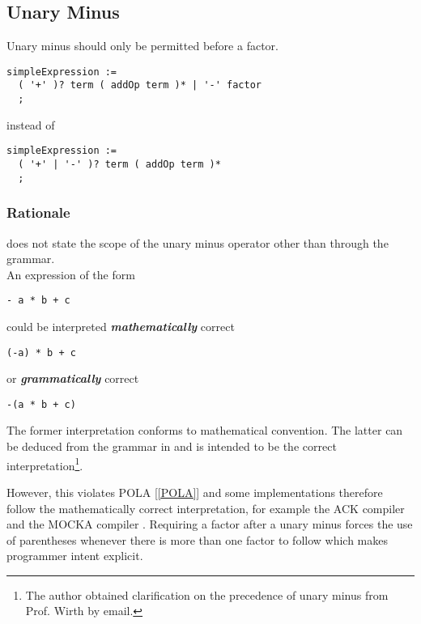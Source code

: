 \documentclass[10pt,a4paper]{article}
\renewcommand{\emph}[1]{\textbf{\textit{#1}}}
\begin{document}
\subsection{Unary Minus}

Unary minus should only be permitted before a factor.

\begin{verbatim}
simpleExpression :=
  ( '+' )? term ( addOp term )* | '-' factor
  ;
\end{verbatim}

\noindent instead of

\begin{verbatim}
simpleExpression :=
  ( '+' | '-' )? term ( addOp term )*
  ;
\end{verbatim}

\subsubsection{Rationale}

\cite{Wirth88} does not state the scope of the unary minus operator other than
through the grammar.\\

\noindent An expression of the form
\begin{lstlisting}
- a * b + c
\end{lstlisting}

\noindent could be interpreted \emph{mathematically} correct
\begin{lstlisting}
(-a) * b + c
\end{lstlisting}

\noindent or \emph{grammatically} correct
\begin{lstlisting}
-(a * b + c)
\end{lstlisting}

The former interpretation conforms to mathematical convention. The latter can
be deduced from the grammar in \cite[pp.156-157]{Wirth88} and is intended to
be the correct interpretation\footnote{The author obtained clarification on
the precedence of unary minus from Prof. Wirth by email.}.

\newpage

\noindent However, this violates POLA [\ref{POLA}] and some implementations
therefore follow the mathematically correct interpretation, for example the
ACK compiler \cite{ACK} and the MOCKA compiler \cite{MOCKA}. Requiring a
factor after a unary minus forces the use of parentheses whenever there is
more than one factor to follow which makes programmer intent explicit.
\end{document}
